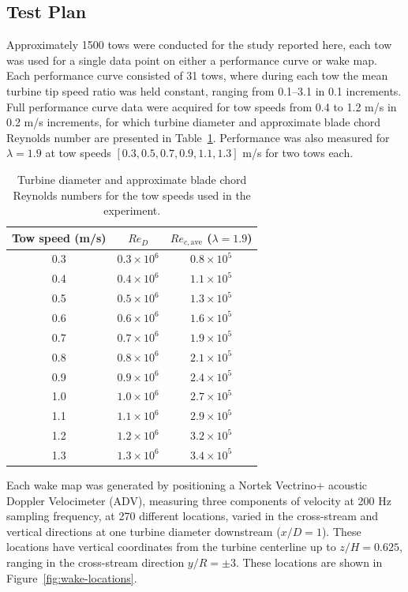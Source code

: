 \documentclass[energies,article,accept,moreauthors,pdftex,12pt,a4paper]{mdpi}
\begin{document}
\subsection{Test Plan}

Approximately 1500 tows were conducted for the study reported here, each tow was
used for a single data point on either a performance curve or wake map. Each
performance curve consisted of 31 tows, where during each tow the mean turbine
tip speed ratio was held constant, ranging from 0.1--3.1 in 0.1 increments. Full
performance curve data were acquired for tow speeds from 0.4 to 1.2 m/s in 0.2
m/s increments, for which turbine diameter and approximate blade chord Reynolds
number are presented in Table~\ref{tab:Re}. Performance was also measured for
$\lambda=1.9$ at tow speeds $[0.3, 0.5, 0.7, 0.9, 1.1, 1.3]$ m/s for two tows
each.

\begin{table}
\centering
\begin{tabular}{ccc}
Tow speed (m/s) & $Re_D$ & $Re_{c,\mathrm{ave}}$ ($\lambda = 1.9$) \\
\hline
0.3 & $0.3 \times 10^6$ & $0.8 \times 10^5$ \\
0.4 & $0.4 \times 10^6$ & $1.1 \times 10^5$ \\
0.5 & $0.5 \times 10^6$ & $1.3 \times 10^5$ \\
0.6 & $0.6 \times 10^6$ & $1.6 \times 10^5$ \\
0.7 & $0.7 \times 10^6$ & $1.9 \times 10^5$ \\
0.8 & $0.8 \times 10^6$ & $2.1 \times 10^5$ \\
0.9 & $0.9 \times 10^6$ & $2.4 \times 10^5$ \\
1.0 & $1.0 \times 10^6$ & $2.7 \times 10^5$ \\
1.1 & $1.1 \times 10^6$ & $2.9 \times 10^5$ \\
1.2 & $1.2 \times 10^6$ & $3.2 \times 10^5$ \\
1.3 & $1.3 \times 10^6$ & $3.4 \times 10^5$ \\
\end{tabular}
\caption{Turbine diameter and approximate blade chord Reynolds numbers for the
tow speeds used in the experiment.}
\label{tab:Re}
\end{table}

Each wake map was generated by positioning a Nortek Vectrino+ acoustic Doppler
Velocimeter (ADV), measuring three components of velocity at 200 Hz sampling
frequency, at 270 different locations, varied in the cross-stream and vertical
directions at one turbine diameter downstream ($x/D=1$). These locations have
vertical coordinates from the turbine centerline up to $z/H=0.625$, ranging in
the cross-stream direction $y/R = \pm 3$. These locations are shown in
Figure~\ref{fig:wake-locations}.
\end{document}
